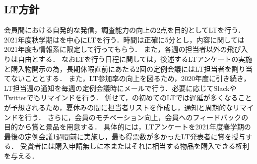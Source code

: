 \subsection*{LT方針}


会員間における自発的な発信，調査能力の向上の2点を目的としてLTを行う．
2021年度秋学期は\firstGrade{}を中心にLTを行う．時間は正確に5分とし，内容に関しては2021年度も情報系に限定して行ってもらう．
また，各週の担当者以外の飛び入りは自由とする．
なおLTを行う日程に関しては，後述するLTアンケートの実施と購入物開示の為，長期休暇直前にあたる2回の定例会議にはLT担当者を割り当てないこととする．
また，LT参加率の向上を図るため，2020年度に引き続き，LT担当週の通知を毎週の定例会議時にメールで行う．必要に応じてSlackやTwitterでもリマインドを行う．
併せて，\firstGrade{}の初めてのLTでは遅延が多くなることが予想されるため，夏休みの間に担当者リストを作成し，通知と周期的なリマインドを行う．
さらに，会員のモチベーション向上，会員へのフィードバックの目的から賞と景品を用意する．
具体的には，LTアンケートを2021年度春学期の最後の定例会議1週間前に実施し，最も得票数が多かったLT発表者に賞を授与する．
受賞者には購入申請無しに本またはそれに相当する物品を購入できる権利を与える．
